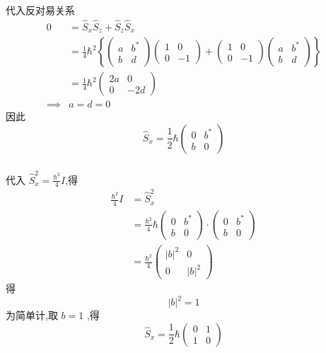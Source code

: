 \begin{frame}[label=current]
  \frametitle{}
代入反对易关系
\[\begin{aligned}
  0&= \hat{S}_x \hat{S}_z + \hat{S}_z \hat{S}_x   \\ 
  &= \frac{1}{4}\hbar^2 \left\{\begin{pmatrix}
    a & b^*\\
    b & d
   \end{pmatrix} \begin{pmatrix}
    1 & 0\\
    0 & -1
   \end{pmatrix} + \begin{pmatrix}
    1 & 0\\
    0 & -1
   \end{pmatrix} \begin{pmatrix}
    a & b^*\\
    b & d
   \end{pmatrix}  \right\} \\
   &= \frac{1}{4}\hbar^2 \begin{pmatrix}
    2a & 0\\
    0 & -2d
   \end{pmatrix}  \\
   \implies & a = d =0
\end{aligned}\]
因此
\[\hat{S}_x = \frac{1}{2}\hbar\begin{pmatrix}
  0 & b^*\\
  b & 0
 \end{pmatrix}\]
\end{frame} 

\begin{frame}[label=current]
  \frametitle{}
代入 $\hat{S}^2_x = \frac{\hbar^2}{4} I $,得
\[\begin{aligned}
  \frac{\hbar^2}{4} I &= \hat{S}^2_x \\
&= \frac{\hbar^2}{4}\hbar\begin{pmatrix}
  0 & b^*\\
  b & 0
 \end{pmatrix} \cdot\begin{pmatrix}
  0 & b^*\\
  b & 0
 \end{pmatrix} \\
 &= \frac{\hbar^2}{4} \begin{pmatrix}
  \left\vert b\right\vert^2 & 0\\
  0 & \left\vert b\right\vert^2
 \end{pmatrix}
\end{aligned}\]
得 $$ \left\vert b\right\vert^2 =1 $$
为简单计,取 $ b =1 $ ,得 
\[\hat{S}_x = \frac{1}{2}\hbar\begin{pmatrix}
  0 & 1\\
  1 & 0
 \end{pmatrix}\]
\end{frame} 

